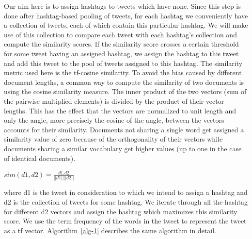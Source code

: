 \documentclass[10pt,a5paper,twoside]{article}
\begin{document}
Our aim here is to assign hashtags to tweets which have none. Since
this step is done after hashtag-based pooling of tweets, for each
hashtag we conveniently have a collection of tweets, each of which contain this
particular hashtag.  We will make use of this collection to compare each
tweet with each hashtag's collection and compute the similarity
scores. If the similarity score crosses a certain threshold for some
tweet having an assigned hashtag, we assign
the hashtag to this tweet and add this tweet to the pool of tweets
assigned to this hashtag. The similarity metric used here is the
tf-cosine similarity. To avoid the bias caused by different document
lengths, a common way to compute the similarity of two documents is
using the cosine similarity measure. The inner product of the two
vectors (sum of the pairwise multiplied elements) is divided by the
product of their vector lengths. This has the effect that the vectors
are normalized to unit length and only the angle, more precisely the
cosine of the angle, between the vectors accounts for their
similarity. Documents not sharing a single word get assigned a
similarity value of zero because of the orthogonality of their vectors
while documents sharing a similar vocabulary get higher values (up to
one in the case of identical documents).

\begin{center}
$sim(d1,d2) = \frac{d1 . d2}{||d1|| ||d2||}$
\end{center}

where d1 is the tweet in consideration to which we intend to assign a
hashtag and d2 is the collection of tweets for some hashtag. We
iterate through all the hashtag for different d2 vectors and assign
the hashtag which maximizes this similarity score. We use the term
frequency of the words in the tweet to represent the tweet as a tf
vector. Algorithm~\ref{alg-1} describes the same algorithm in detail.


\end{document}
